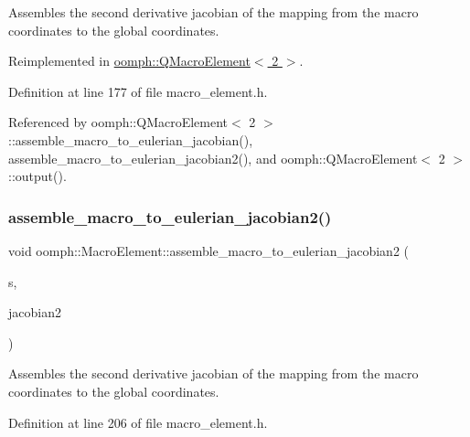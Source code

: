 Assembles the second derivative jacobian of the mapping from the macro coordinates to the global coordinates. 



Reimplemented in \hyperlink{classoomph_1_1QMacroElement_3_012_01_4_aef266683860031114776d25f51e8e306}{oomph\+::\+Q\+Macro\+Element$<$ 2 $>$}.



Definition at line 177 of file macro\+\_\+element.\+h.



Referenced by oomph\+::\+Q\+Macro\+Element$<$ 2 $>$\+::assemble\+\_\+macro\+\_\+to\+\_\+eulerian\+\_\+jacobian(), assemble\+\_\+macro\+\_\+to\+\_\+eulerian\+\_\+jacobian2(), and oomph\+::\+Q\+Macro\+Element$<$ 2 $>$\+::output().

\mbox{\label{classoomph_1_1MacroElement_ae3c34b538e970d152a7f107d7ae418c8}} 
\subsubsection{\texorpdfstring{assemble\+\_\+macro\+\_\+to\+\_\+eulerian\+\_\+jacobian2()}{assemble\_macro\_to\_eulerian\_jacobian2()}\hspace{0.1cm}{\footnotesize\ttfamily [2/2]}}
{\footnotesize\ttfamily void oomph\+::\+Macro\+Element\+::assemble\+\_\+macro\+\_\+to\+\_\+eulerian\+\_\+jacobian2 (\begin{DoxyParamCaption}\item[{const \hyperlink{classoomph_1_1Vector}{Vector}$<$ double $>$ \&}]{s,  }\item[{\hyperlink{classoomph_1_1DenseMatrix}{Dense\+Matrix}$<$ double $>$ \&}]{jacobian2 }\end{DoxyParamCaption})\hspace{0.3cm}{\ttfamily [inline]}}



Assembles the second derivative jacobian of the mapping from the macro coordinates to the global coordinates. 



Definition at line 206 of file macro\+\_\+element.\+h.



